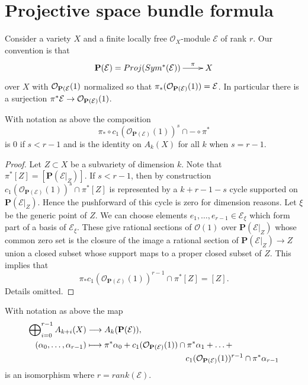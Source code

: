 \section{Projective space bundle formula}
\label{section-projective-space-bundle-formula}

\noindent
Consider a variety $X$ and a finite locally free
${\mathcal O}_X$-module ${\mathcal E}$ of rank $r$.
Our convention is that
$$
\xymatrix{
{\bf P}({\mathcal E}) = Proj(Sym^*({\mathcal E}))
\ar[r]^-\pi
& X
}
$$
over $X$ with ${\mathcal O}_{{\bf P}({\mathcal E}}(1)$ normalized so that
$\pi_*({\mathcal O}_{{\bf P}({\mathcal E})}(1)) = {\mathcal E}$.
In particular there is a surjection
$\pi^*{\mathcal E} \to {\mathcal O}_{{\bf P}({\mathcal E})}(1)$.

\begin{lemma}
\label{lemma-cap-projective-bundle}
With notation as above the composition
$$
\pi_* \circ c_1(\mathcal{O}_{\mathbf{P}(\mathcal{E})}(1))^s \cap -
\circ \pi^*
$$
is $0$ if $s < r - 1$ and is the identity on $A_k(X)$ for all $k$
when $s = r - 1$.
\end{lemma}

\begin{proof}
Let $Z \subset X$ be a subvariety of dimension $k$.
Note that $\pi^*[Z] = [\mathbf{P}(\mathcal{E}|_Z)]$.
If $s < r - 1$, then by construction
$c_1(\mathcal{O}_{\mathbf{P}(\mathcal{E})}(1))^s \cap \pi^*[Z]$
is represented by a $k + r - 1 - s$ cycle supported on
$\mathbf{P}(\mathcal{E}|_Z)$. Hence the pushforward of this cycle
is zero for dimension reasons.
Let $\xi$ be the generic point of $Z$.
We can choose elements $e_1, \ldots, e_{r - 1} \in \mathcal{E}_\xi$
which form part of a basis of $\mathcal{E}_\xi$. These give rational
sections of $\mathcal{O}(1)$ over $\mathbf{P}(\mathcal{E}|_Z)$
whose common zero set is the closure of the image a rational section of
$\mathbf{P}(\mathcal{E}|_Z) \to Z$ union a closed subset whose
support maps to a proper closed subset of $Z$. This implies that
$$
\pi_* c_1(\mathcal{O}_{\mathbf{P}(\mathcal{E})}(1))^{r - 1} \cap \pi^*[Z]
=
[Z].
$$
Details omitted.
\end{proof}

\begin{lemma}
\label{lemma-chow-ring-projective-bundle}
With notation as above the map
\begin{align*}
\bigoplus\nolimits_{i=0}^{r-1} A_{k + i}(X)
& \longrightarrow
A_k({\bf P}({\mathcal E})), \\
(\alpha_0,\ldots,\alpha_{r-1}) &
\longmapsto
\pi^*\alpha_0 +
c_1(\mathcal{O}_{\mathbf{P}(\mathcal{E})}(1)) \cap \pi^*\alpha_1
+ \ldots + \\
&
\quad \quad \quad \quad
\quad \quad \quad \quad
\quad \quad \quad \quad
c_1(\mathcal{O}_{\mathbf{P}(\mathcal{E})}(1))^{r - 1} \cap \pi^*\alpha_{r-1}
\end{align*}
is an isomorphism where $r = rank({\mathcal E})$.
\end{lemma}

